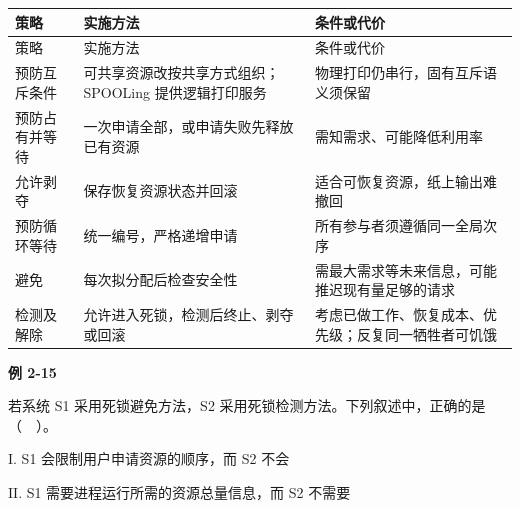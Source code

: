 \par\smallskip
\begin{wideblock}
{\fontsize{9.3}{12}\selectfont\setlength{\tabcolsep}{2.5pt}\setlength{\LTleft}{0pt}\setlength{\LTright}{0pt}
\begin{longtable}{@{}>{\raggedright\arraybackslash}p{}>{\raggedright\arraybackslash}p{}>{\raggedright\arraybackslash}p{}@{}}
\toprule
策略 & 实施方法 & 条件或代价 \\

\midrule\endfirsthead\toprule
策略 & 实施方法 & 条件或代价 \\

\midrule\endhead\bottomrule\endfoot
预防互斥条件 & 可共享资源改按共享方式组织；SPOOLing 提供逻辑打印服务 & 物理打印仍串行，固有互斥语义须保留 \\

预防占有并等待 & 一次申请全部，或申请失败先释放已有资源 & 需知需求、可能降低利用率 \\

允许剥夺 & 保存恢复资源状态并回滚 & 适合可恢复资源，纸上输出难撤回 \\

预防循环等待 & 统一编号，严格递增申请 & 所有参与者须遵循同一全局次序 \\

避免 & 每次拟分配后检查安全性 & 需最大需求等未来信息，可能推迟现有量足够的请求 \\

检测及解除 & 允许进入死锁，检测后终止、剥夺或回滚 & 考虑已做工作、恢复成本、优先级；反复同一牺牲者可饥饿 \\

\end{longtable}}
\end{wideblock}
\par\smallskip

\par\medskip{}\noindent\hypertarget{OS02-E15}{}\label{OS02-E15}\textbf{例 2-15}\par\nobreak\smallskip

若系统 S1 采用死锁避免方法，S2 采用死锁检测方法。下列叙述中，正确的是（　）。

\ensuremath{\mathrm{I}}. S1 会限制用户申请资源的顺序，而 S2 不会

\ensuremath{\mathrm{II}}. S1 需要进程运行所需的资源总量信息，而 S2 不需要


